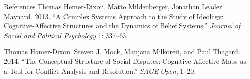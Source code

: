 \documentclass[
  ignorenonframetext,
]{beamer}
\begin{document}
\begin{frame}{References}
\leavevmode\hypertarget{ref-HomerDixon2013}{}%
Thomas Homer-Dixon, Matto Mildenberger, Jonathan Leader Maynard. 2013.
``A Complex Systems Approach to the Study of Ideology:
Cognitive-Affective Structures and the Dynamics of Belief Systems.''
\emph{Journal of Social and Political Psychology} 1: 337--63.

\leavevmode\hypertarget{ref-HomerDixon2014}{}%
Thomas Homer-Dixon, Steven J. Mock, Manjana Milkoreit, and Paul Thagard.
2014. ``The Conceptual Structure of Social Disputes: Cognitive-Affective
Maps as a Tool for Conflict Analysis and Resolution.'' \emph{SAGE Open},
1--20.

\end{frame}
\end{document}

